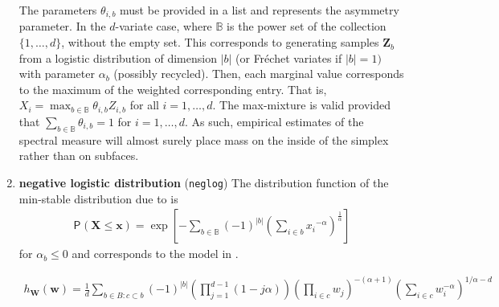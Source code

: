 \documentclass{article}
\newcommand{\bs}[1]{\boldsymbol {#1}}
\renewcommand{\P}[2][]{{\mathsf P}_{#1}\left(#2\right)}
\newcommand{\code}[1]{\texttt{#1}}
\begin{document}
\begin{enumerate}
The parameters $\theta_{i, b}$ must be provided in a list and represents the asymmetry parameter.
In the $d$-variate 
case, where $\mathbb{B}$ is the power set of the collection $\{1, \ldots, d\}$, without the empty set. This corresponds to 
generating samples $\bs{Z}_b$ from a logistic distribution of dimension $|b|$ (or Fréchet variates if $|b|=1)$ with parameter 
$\alpha_b$ (possibly recycled). Then, each marginal value corresponds to the maximum of the weighted corresponding entry. That 
is, $X_{i}=\max_{b \in \mathbb{B}}\theta_{i, b}Z_{i,b}$ for all $i=1, \ldots, d$. The max-mixture is valid provided that $\sum_{b 
\in \mathbb{B}} \theta_{i,b}=1$ for $i=1, \ldots, d.$ As such, empirical estimates of the spectral measure will almost surely 
place mass on the inside of the simplex rather than on subfaces.
\item \textbf{negative logistic distribution} (\code{neglog})
The distribution function of the min-stable distribution due to \cite{Galambos:1975}  is
\begin{align*}
   \P{\bs{X} \leq \bs{x}} = \exp \left[ -\sum_{b \in \mathbb{B}} (-1)^{|b|}\left(\sum_{i \in b} 
{x_i}^{-\alpha}\right)^{\frac{1}{\alpha}}\right]
\end{align*}
for $\alpha_b\leq 0$ and corresponds to the model in \cite{Dombry:2016}.

\begin{align*}
   h_{\bs{W}}(\bs{w}) = \frac{1}{d} \sum_{b \in B: c \subset b} (-1)^{|b|} 
\left(\prod_{j=1}^{d-1}(1-j\alpha)\right)\left(\prod_{i \in c}w_j\right)^{-(\alpha+1)}\left(\sum_{i \in c} 
w_i^{-\alpha}\right)^{1/\alpha-d}
\end{align*}


\end{enumerate}
\end{document}
